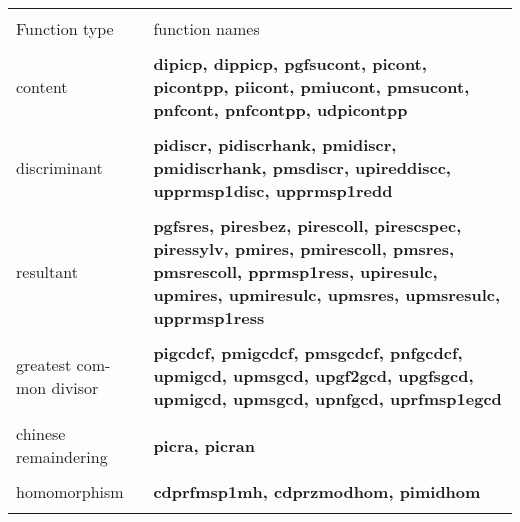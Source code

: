 \leer
\begin{center}
\begin{tabular}{|p{1.1in}|p{4.0in}|}
\hline &\\[-1.3ex]
Function type  &
function names\\[1.5ex]
\hline &\\[-1.3ex]

content & 
{\bf dipicp, dippicp, pgfsucont, picont, picontpp, piicont, \newline
        pmiucont, pmsucont, pnfcont, pnfcontpp, \newline
        udpicontpp }\\[1.5ex]
\hline &\\[-1.3ex]

discriminant & 
{\bf pidiscr, pidiscrhank, pmidiscr, pmidiscrhank, \newline
        pmsdiscr, upireddiscc, upprmsp1disc, \newline
        upprmsp1redd }\\[1.5ex]
\hline &\\[-1.3ex]

resultant & 
{\bf pgfsres, piresbez, pirescoll, pirescspec, piressylv, \newline
        pmires, pmirescoll, pmsres, pmsrescoll, pprmsp1ress, \newline
        upiresulc, upmires, upmiresulc, upmsres, \newline
        upmsresulc, upprmsp1ress }\\[1.5ex]
\hline &\\[-1.3ex]

greatest com- \newline
mon divisor & 
{\bf pigcdcf, pmigcdcf, pmsgcdcf, pnfgcdcf, upmigcd, \newline
        upmsgcd, upgf2gcd, upgfsgcd, upmigcd, upmsgcd, upnfgcd, uprfmsp1egcd }\\[1.5ex]
\hline &\\[-1.3ex]

chinese \newline
remaindering & 
{\bf picra, picran }\\[1.5ex]
\hline &\\[-1.3ex]

homomorphism & 
{\bf cdprfmsp1mh, cdprzmodhom, pimidhom }\\[1.5ex]
\hline &\\[-1.3ex]


\end{tabular}
\end{center}
